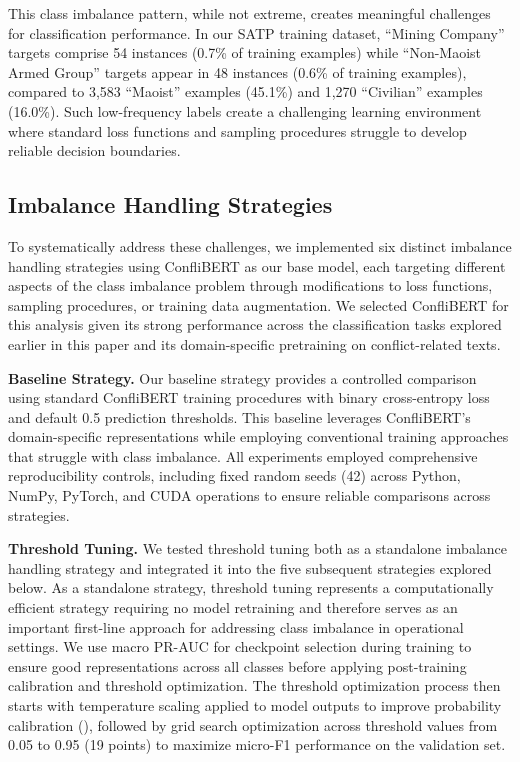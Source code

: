 \documentclass[
  11pt,
]{article}
\begin{document}
This class imbalance pattern, while not extreme, creates meaningful
challenges for classification performance. In our SATP training dataset,
``Mining Company'' targets comprise 54 instances (0.7\% of training
examples) while ``Non-Maoist Armed Group'' targets appear in 48
instances (0.6\% of training examples), compared to 3,583 ``Maoist''
examples (45.1\%) and 1,270 ``Civilian'' examples (16.0\%). Such
low-frequency labels create a challenging learning environment where
standard loss functions and sampling procedures struggle to develop
reliable decision boundaries.

\subsection{Imbalance Handling
Strategies}\label{imbalance-handling-strategies-1}

To systematically address these challenges, we implemented six distinct
imbalance handling strategies using ConfliBERT as our base model, each
targeting different aspects of the class imbalance problem through
modifications to loss functions, sampling procedures, or training data
augmentation. We selected ConfliBERT for this analysis given its strong
performance across the classification tasks explored earlier in this
paper and its domain-specific pretraining on conflict-related texts.

\textbf{Baseline Strategy.} Our baseline strategy provides a controlled
comparison using standard ConfliBERT training procedures with binary
cross-entropy loss and default 0.5 prediction thresholds. This baseline
leverages ConfliBERT's domain-specific representations while employing
conventional training approaches that struggle with class imbalance. All
experiments employed comprehensive reproducibility controls, including
fixed random seeds (42) across Python, NumPy, PyTorch, and CUDA
operations to ensure reliable comparisons across strategies.

\textbf{Threshold Tuning.} We tested threshold tuning both as a
standalone imbalance handling strategy and integrated it into the five
subsequent strategies explored below. As a standalone strategy,
threshold tuning represents a computationally efficient strategy
requiring no model retraining and therefore serves as an important
first-line approach for addressing class imbalance in operational
settings. We use macro PR-AUC for checkpoint selection during training
to ensure good representations across all classes before applying
post-training calibration and threshold optimization. The threshold
optimization process then starts with temperature scaling applied to
model outputs to improve probability calibration
(), followed by grid search
optimization across threshold values from 0.05 to 0.95 (19 points) to
maximize micro-F1 performance on the validation set.
\end{document}
